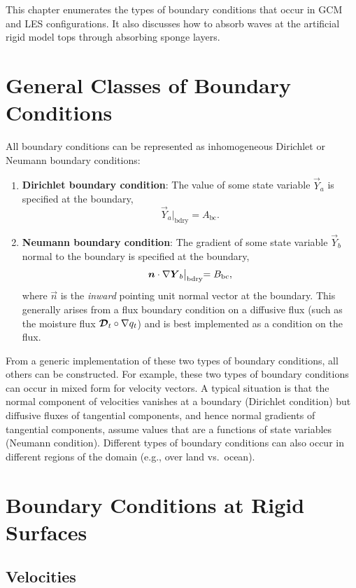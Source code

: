 \documentclass{report}
\begin{document}
This chapter enumerates the types of boundary conditions that occur in GCM and LES configurations. It also discusses how to absorb waves at the artificial rigid model tops through absorbing sponge layers.

\section{General Classes of Boundary Conditions}

All boundary conditions can be represented as inhomogeneous Dirichlet or Neumann boundary conditions:
\begin{enumerate}
    \item \textbf{Dirichlet boundary condition}: The value of some state variable $\vec{Y}_a$ is specified at the boundary,
    \[
    \vec{Y}_a\bigl|_\mathrm{bdry} = A_\mathrm{bc}.
    \]
    \item \textbf{Neumann boundary condition}: The gradient of some state variable $\vec{Y}_b$ normal to the boundary is specified at the boundary,
    \[
    \boldsymbol{{n}} \cdot \nabla\boldsymbol{{Y}}_b\bigl|_\mathrm{bdry} = B_\mathrm{bc},
    \] 
    where $\vec{n}$ is the \emph{inward} pointing unit normal vector at the boundary. This generally arises from a flux boundary condition on a diffusive flux (such as the moisture flux $\boldsymbol{{\mathcal{D}}}_t \circ \nabla q_t$) and is best implemented as a condition on the flux.
\end{enumerate}
From a generic implementation of these two types of boundary conditions, all others can be constructed. For example, these two types of boundary conditions can occur in mixed form for velocity vectors. A typical situation is that the normal component of velocities vanishes at a boundary (Dirichlet condition) but diffusive fluxes of tangential components, and hence normal gradients of tangential components, assume values that are a functions of state variables (Neumann condition). Different types of boundary conditions can also occur in different regions of the domain (e.g., over land vs.\ ocean).

\section{Boundary Conditions at Rigid Surfaces}

\subsection{Velocities}
\end{document}
